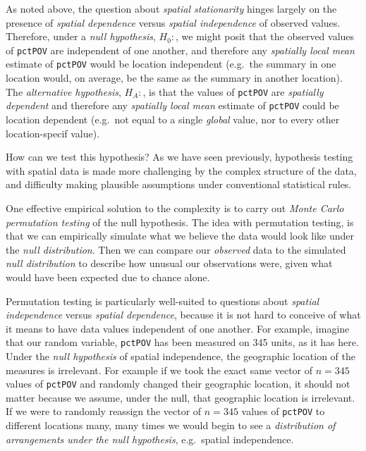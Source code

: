\documentclass[
]{book}
\begin{document}
As noted above, the question about \emph{spatial stationarity} hinges largely on the presence of \emph{spatial dependence} versus \emph{spatial independence} of observed values. Therefore, under a \emph{null hypothesis}, \(H_0:\), we might posit that the observed values of \texttt{pctPOV} are independent of one another, and therefore any \emph{spatially local mean} estimate of \texttt{pctPOV} would be location independent (e.g.~the summary in one location would, on average, be the same as the summary in another location). The \emph{alternative hypothesis}, \(H_A:\), is that the values of \texttt{pctPOV} are \emph{spatially dependent} and therefore any \emph{spatially local mean} estimate of \texttt{pctPOV} could be location dependent (e.g.~not equal to a single \emph{global} value, nor to every other location-specif value).

How can we test this hypothesis? As we have seen previously, hypothesis testing with spatial data is made more challenging by the complex structure of the data, and difficulty making plausible assumptions under conventional statistical rules.

One effective empirical solution to the complexity is to carry out \emph{Monte Carlo permutation testing} of the null hypothesis. The idea with permutation testing, is that we can empirically simulate what we believe the data would look like under the \emph{null distribution}. Then we can compare our \emph{observed} data to the simulated \emph{null distribution} to describe how unusual our observations were, given what would have been expected due to chance alone.

Permutation testing is particularly well-suited to questions about \emph{spatial independence} versus \emph{spatial dependence}, because it is not hard to conceive of what it means to have data values independent of one another. For example, imagine that our random variable, \texttt{pctPOV} has been measured on 345 units, as it has here. Under the \emph{null hypothesis} of spatial independence, the geographic location of the measures is irrelevant. For example if we took the exact same vector of \(n=345\) values of \texttt{pctPOV} and randomly changed their geographic location, it should not matter because we assume, under the null, that geographic location is irrelevant. If we were to randomly reassign the vector of \(n=345\) values of \texttt{pctPOV} to different locations many, many times we would begin to see a \emph{distribution of arrangements under the null hypothesis}, e.g.~spatial independence.
\end{document}
